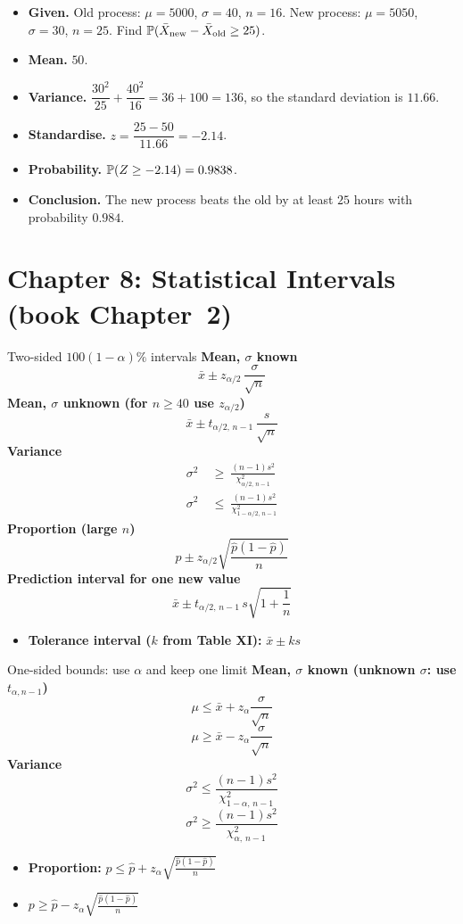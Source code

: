 \begin{example}
\begin{itemize}
  \item \textbf{Given.} Old process: $\mu=5000$, $\sigma=40$, $n=16$. New process: $\mu=5050$, $\sigma=30$, $n=25$. Find $\mathbb{P}(\bar{X}_{\text{new}}-\bar{X}_{\text{old}}\ge25)$.
  \item \textbf{Mean.} $50$.
  \item \textbf{Variance.} $\dfrac{30^2}{25}+\dfrac{40^2}{16}=36+100=136$, so the standard deviation is $11.66$.
  \item \textbf{Standardise.} $z=\dfrac{25-50}{11.66}=-2.14$.
  \item \textbf{Probability.} $\mathbb{P}(Z\ge-2.14)=0.9838$.
  \item \textbf{Conclusion.} The new process beats the old by at least $25$ hours with probability $0.984$.
\end{itemize}
\end{example}

\section{Chapter 8: Statistical Intervals (book Chapter~2)}

\begin{formulabox}{Two-sided $100(1-\alpha)\%$ intervals}
\textbf{Mean, $\sigma$ known}
\[ \bar{x}\pm z_{\alpha/2}\,\frac{\sigma}{\sqrt n} \]
\textbf{Mean, $\sigma$ unknown (for $n\ge40$ use $z_{\alpha/2}$)}
\[ \bar{x}\pm t_{\alpha/2,\,n-1}\,\frac{s}{\sqrt n} \]
\textbf{Variance}
\[ \begin{aligned}\sigma^2&\ \ge\ \frac{(n-1)s^2}{\chi^2_{\alpha/2,\,n-1}}\\[4pt] \sigma^2&\ \le\ \frac{(n-1)s^2}{\chi^2_{1-\alpha/2,\,n-1}}\end{aligned} \]
\textbf{Proportion (large $n$)}
\[ \hat{p}\pm z_{\alpha/2}\sqrt{\frac{\hat{p}(1-\hat{p})}{n}} \]
\textbf{Prediction interval for one new value}
\[ \bar{x}\pm t_{\alpha/2,\,n-1}\,s\sqrt{1+\frac1n} \]
\begin{itemize}
  \item \textbf{Tolerance interval ($k$ from Table XI):} $\bar{x}\pm ks$
\end{itemize}
\end{formulabox}

\begin{formulabox}{One-sided bounds: use $\alpha$ and keep one limit}
\textbf{Mean, $\sigma$ known (unknown $\sigma$: use $t_{\alpha,n-1}$)}
\[ \mu\le\bar{x}+z_\alpha\frac{\sigma}{\sqrt n} \]
\[ \mu\ge\bar{x}-z_\alpha\frac{\sigma}{\sqrt n} \]
\textbf{Variance}
\[ \sigma^2\le\frac{(n-1)s^2}{\chi^2_{1-\alpha,\,n-1}} \]
\[ \sigma^2\ge\frac{(n-1)s^2}{\chi^2_{\alpha,\,n-1}} \]
\begin{itemize}
  \item \textbf{Proportion:} $p\le\hat{p}+z_\alpha\sqrt{\tfrac{\hat{p}(1-\hat{p})}{n}}$
  \item $p\ge\hat{p}-z_\alpha\sqrt{\tfrac{\hat{p}(1-\hat{p})}{n}}$
\end{itemize}
\end{formulabox}

